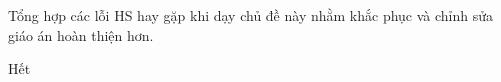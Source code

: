 \documentclass[../main.tex]{subfiles}
\begin{document}
Tổng hợp các lỗi HS hay gặp khi dạy chủ đề này nhằm khắc phục và chỉnh sửa giáo án hoàn thiện hơn.
\par\medskip
\noindent\TTcham[\linewidth]\par\medskip
\noindent\TTcham[\linewidth]\par\medskip
\noindent\TTcham[\linewidth]

\begin{center}
       \faGg\faGg\quad Hết \quad\faGg\faGg
\end{center}
\clearpage
\makeatletter\let\@textbottom\GAluutextbottom\makeatother
\end{document}
